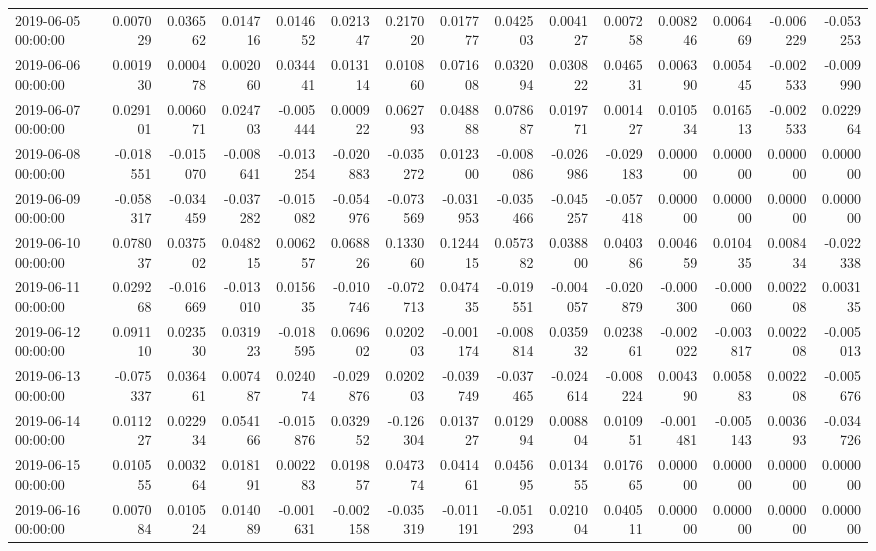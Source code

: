 \begin{tabular}{lrrrrrrrrrrrrrr}
2019-06-05 00:00:00 & 0.007029 & 0.036562 & 0.014716 & 0.014652 & 0.021347 & 0.217020 & 0.017777 & 0.042503 & 0.004127 & 0.007258 & 0.008246 & 0.006469 & -0.006229 & -0.053253 \\
2019-06-06 00:00:00 & 0.001930 & 0.000478 & 0.002060 & 0.034441 & 0.013114 & 0.010860 & 0.071608 & 0.032094 & 0.030822 & 0.046531 & 0.006390 & 0.005445 & -0.002533 & -0.009990 \\
2019-06-07 00:00:00 & 0.029101 & 0.006071 & 0.024703 & -0.005444 & 0.000922 & 0.062793 & 0.048888 & 0.078687 & 0.019771 & 0.001427 & 0.010534 & 0.016513 & -0.002533 & 0.022964 \\
2019-06-08 00:00:00 & -0.018551 & -0.015070 & -0.008641 & -0.013254 & -0.020883 & -0.035272 & 0.012300 & -0.008086 & -0.026986 & -0.029183 & 0.000000 & 0.000000 & 0.000000 & 0.000000 \\
2019-06-09 00:00:00 & -0.058317 & -0.034459 & -0.037282 & -0.015082 & -0.054976 & -0.073569 & -0.031953 & -0.035466 & -0.045257 & -0.057418 & 0.000000 & 0.000000 & 0.000000 & 0.000000 \\
2019-06-10 00:00:00 & 0.078037 & 0.037502 & 0.048215 & 0.006257 & 0.068826 & 0.133060 & 0.124415 & 0.057382 & 0.038800 & 0.040386 & 0.004659 & 0.010435 & 0.008434 & -0.022338 \\
2019-06-11 00:00:00 & 0.029268 & -0.016669 & -0.013010 & 0.015635 & -0.010746 & -0.072713 & 0.047435 & -0.019551 & -0.004057 & -0.020879 & -0.000300 & -0.000060 & 0.002208 & 0.003135 \\
2019-06-12 00:00:00 & 0.091110 & 0.023530 & 0.031923 & -0.018595 & 0.069602 & 0.020203 & -0.001174 & -0.008814 & 0.035932 & 0.023861 & -0.002022 & -0.003817 & 0.002208 & -0.005013 \\
2019-06-13 00:00:00 & -0.075337 & 0.036461 & 0.007487 & 0.024074 & -0.029876 & 0.020203 & -0.039749 & -0.037465 & -0.024614 & -0.008224 & 0.004390 & 0.005883 & 0.002208 & -0.005676 \\
2019-06-14 00:00:00 & 0.011227 & 0.022934 & 0.054166 & -0.015876 & 0.032952 & -0.126304 & 0.013727 & 0.012994 & 0.008804 & 0.010951 & -0.001481 & -0.005143 & 0.003693 & -0.034726 \\
2019-06-15 00:00:00 & 0.010555 & 0.003264 & 0.018191 & 0.002283 & 0.019857 & 0.047374 & 0.041461 & 0.045695 & 0.013455 & 0.017665 & 0.000000 & 0.000000 & 0.000000 & 0.000000 \\
2019-06-16 00:00:00 & 0.007084 & 0.010524 & 0.014089 & -0.001631 & -0.002158 & -0.035319 & -0.011191 & -0.051293 & 0.021004 & 0.040511 & 0.000000 & 0.000000 & 0.000000 & 0.000000 \\

\end{tabular}

